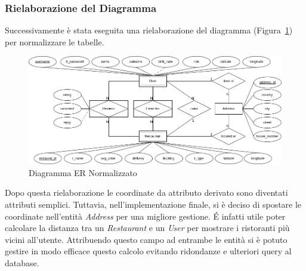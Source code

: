 \subsubsection{Rielaborazione del Diagramma}
Successivamente è stata eseguita una rielaborazione del diagramma 
(Figura~\ref{fig:er-diagram2})
per normalizzare le tabelle.
\begin{figure}[H]
  \centering
  \includegraphics[width=\textwidth]{images/ER-refactored.png}
  \caption{Diagramma ER Normalizzato}
  \label{fig:er-diagram2}
\end{figure}
Dopo questa rielaborazione le coordinate da attributo derivato 
sono diventati attributi semplici.
Tuttavia, nell'implementazione finale, si è deciso di spostare le 
coordinate nell'entità \textit{Address} per una migliore gestione.
\'E infatti utile poter calcolare la distanza tra un \textit{Restaurant} 
e un \textit{User} per mostrare i ristoranti più vicini all'utente.
Attribuendo questo campo ad entrambe le entità si è potuto gestire 
in modo efficace questo calcolo evitando ridondanze e ulteriori 
query al database.
